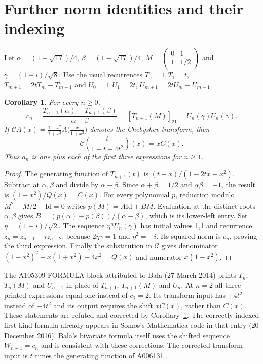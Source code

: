 \documentclass[11pt]{article}
\newtheorem{corollary}{Corollary}
\begin{document}
\section{Further norm identities and their indexing}
Let $\alpha=(1+\sqrt{17})/4$, $\beta=(1-\sqrt{17})/4$,
$M=\left(\begin{smallmatrix}0&1\\1&1/2\end{smallmatrix}\right)$ and
$\gamma=(1+i)/\sqrt8$.
Use the usual recurrences $T_0=1,T_1=t$,
$T_{m+1}=2tT_m-T_{m-1}$ and $U_0=1,U_1=2t$,
$U_{m+1}=2tU_m-U_{m-1}$.

\begin{corollary}\label{cor:chebyshev}
For every $n\geq0$,
\[
 c_n=\frac{T_{n+1}(\alpha)-T_{n+1}(\beta)}{\alpha-\beta}
     =[T_{n+1}(M)]_{21}
     =U_n(\gamma)U_n(\overline\gamma).
\]
If $\mathcal C A(x)=\frac{1-x^2}{1+x^2}
A\bigl(\frac{x}{1+x^2}\bigr)$ denotes the Chebyshev transform,
then
\[
 \mathcal C\!\left(\frac{t}{1-t-4t^2}\right)(x)=xC(x).
\]
Thus $a_n$ is one plus each of the first three expressions for $n\geq1$.
\end{corollary}
\begin{proof}
The generating function of $T_{n+1}(t)$ is
$(t-x)/(1-2tx+x^2)$. Subtract at $\alpha,\beta$ and divide
by $\alpha-\beta$. Since $\alpha+\beta=1/2$ and
$\alpha\beta=-1$, the result is $(1-x^2)/Q(x)=C(x)$.
For every polynomial $p$, reduction modulo
$M^2-M/2-\mathrm{Id}=0$ writes $p(M)=A\mathrm{Id}+BM$.
Evaluation at the distinct roots $\alpha,\beta$ gives
$B=(p(\alpha)-p(\beta))/(\alpha-\beta)$, which is its lower-left
entry.
Set $\eta=(1-i)/\sqrt2$. The sequence
$\eta^nU_n(\gamma)$ has initial values 1,1 and recurrence
$z_n=z_{n-1}+iz_{n-2}$, because $2\eta\gamma=1$ and
$\eta^2=-i$. Its squared norm is $c_n$, proving the third expression.
Finally the substitution in $\mathcal C$ gives denominator
$(1+x^2)^2-x(1+x^2)-4x^2=Q(x)$ and numerator $x(1-x^2)$.
\end{proof}

The A105309 FORMULA block attributed to Bala (27 March 2014)
prints $T_n$, $T_n(M)$ and $U_{n-1}$ in place of
$T_{n+1}$, $T_{n+1}(M)$ and $U_n$. At $n=2$ all three
printed expressions equal one instead of $c_2=2$.
Its transform input has $+4t^2$ instead of $-4t^2$ and its output
requires the shift $xC(x)$, rather than $C(x)$.
These statements are refuted-and-corrected by
Corollary~\ref{cor:chebyshev}. The correctly indexed first-kind formula
already appears in Somos's Mathematica code in that entry
(20 December 2016). Bala's bivariate formula itself uses the shifted
sequence $W_{n+1}=c_n$ and is consistent with these corrections.
The corrected transform input is $t$ times the generating function
of A006131 \cite{auxiliary}.
\end{document}
